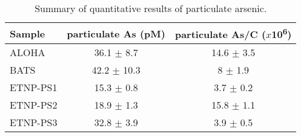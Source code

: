 \begin{table}[ht]
\centering
\begingroup\fontsize{7pt}{8pt}\selectfont
\begin{tabular}{p{1.2cm}c{2cm}c{2cm}}
  \hline
Sample & particulate As (pM) & particulate As/C ($x$10\textsuperscript{6}) \\ 
  \hline
ALOHA & 36.1  $\pm$ 8.7 & 14.6  $\pm$ 3.5 \\ 
  BATS & 42.2  $\pm$ 10.3 & 8  $\pm$ 1.9 \\ 
  ETNP-PS1 & 15.3  $\pm$ 0.8 & 3.7  $\pm$ 0.2 \\ 
  ETNP-PS2 & 18.9  $\pm$ 1.3 & 15.8  $\pm$ 1.1 \\ 
  ETNP-PS3 & 32.8  $\pm$ 3.9 & 3.9  $\pm$ 0.5 \\ 
   \hline
\end{tabular}
\endgroup
\caption{\label{QuanSummaryTable}Summary of quantitative results of particulate arsenic.} 
\end{table}
